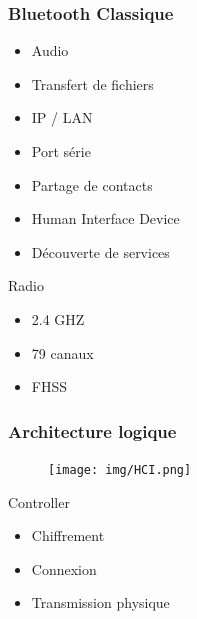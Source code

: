 \begin{frame}[t]
	\frametitle{Bluetooth Classique}
	\begin{minipage}[t]{0.66\linewidth}
		\vspace{0.5cm}
		\vspace{0.5cm}
		\begin{itemize}
			\item Audio
			\item Transfert de fichiers
			\item IP / LAN
			\item Port série
			\item Partage de contacts
			\item Human Interface Device
			\item Découverte de services
		\end{itemize}
	\end{minipage}
	\begin{minipage}[t]{0.30\linewidth}
		\vspace{0.5cm}
		\begin{block}{Radio}
			\begin{itemize}
				\item 2.4 GHZ
				\item 79 canaux
				\item FHSS
			\end{itemize}
		\end{block}
	\end{minipage}
\end{frame}

\begin{frame}
	\frametitle{Architecture logique}
	\begin{minipage}{0.45\linewidth}
		\begin{figure}
			\texttt{[image: img/HCI.png]}
		\end{figure}
	\end{minipage}
	\begin{minipage}{0.50\linewidth}
		\begin{block}{Controller}
			\begin{itemize}
				\item Chiffrement
				\item Connexion
				\item Transmission physique
			\end{itemize}
		\end{block}
	\end{minipage}
\end{frame}

